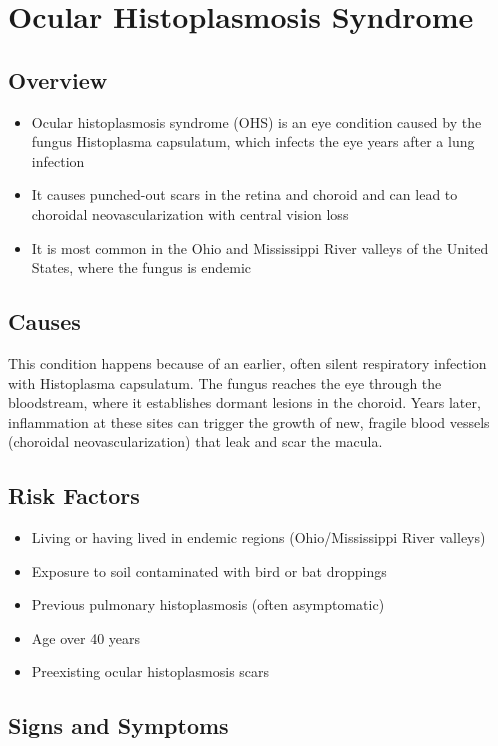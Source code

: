 \chapter{Ocular Histoplasmosis Syndrome}
\label{sec:Ocular Histoplasmosis Syndrome}

\section{Overview}
\begin{itemize}[noitemsep]
  \item Ocular histoplasmosis syndrome (OHS) is an eye condition caused by the fungus Histoplasma capsulatum, which infects the eye years after a lung infection
  \item It causes punched-out scars in the retina and choroid and can lead to choroidal neovascularization with central vision loss
  \item It is most common in the Ohio and Mississippi River valleys of the United States, where the fungus is endemic
\end{itemize}
\section{Causes}
This condition happens because of an earlier, often silent respiratory infection with Histoplasma capsulatum. The fungus reaches the eye through the bloodstream, where it establishes dormant lesions in the choroid. Years later, inflammation at these sites can trigger the growth of new, fragile blood vessels (choroidal neovascularization) that leak and scar the macula.
\section{Risk Factors}
\begin{itemize}[noitemsep]
  \item Living or having lived in endemic regions (Ohio/Mississippi River valleys)
  \item Exposure to soil contaminated with bird or bat droppings
  \item Previous pulmonary histoplasmosis (often asymptomatic)
  \item Age over 40 years
  \item Preexisting ocular histoplasmosis scars
\end{itemize}
\section{Signs and Symptoms}
